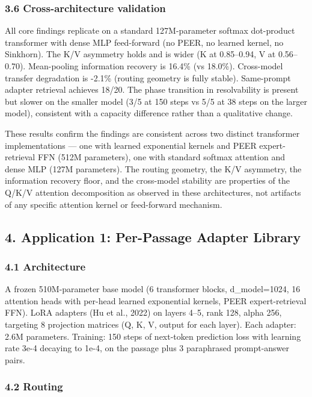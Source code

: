 \subsubsection{3.6 Cross-architecture validation}\label{cross-architecture-validation}

All core findings replicate on a standard 127M-parameter softmax dot-product transformer with dense MLP feed-forward (no PEER, no learned kernel, no Sinkhorn). The K/V asymmetry holds and is wider (K at 0.85--0.94, V at 0.56--0.70). Mean-pooling information recovery is 16.4\% (vs 18.0\%). Cross-model transfer degradation is -2.1\% (routing geometry is fully stable). Same-prompt adapter retrieval achieves 18/20. The phase transition in resolvability is present but slower on the smaller model (3/5 at 150 steps vs 5/5 at 38 steps on the larger model), consistent with a capacity difference rather than a qualitative change.

These results confirm the findings are consistent across two distinct transformer implementations --- one with learned exponential kernels and PEER expert-retrieval FFN (512M parameters), one with standard softmax attention and dense MLP (127M parameters). The routing geometry, the K/V asymmetry, the information recovery floor, and the cross-model stability are properties of the Q/K/V attention decomposition as observed in these architectures, not artifacts of any specific attention kernel or feed-forward mechanism.

\subsection{4. Application 1: Per-Passage Adapter Library}\label{application-1-per-passage-adapter-library}

\subsubsection{4.1 Architecture}\label{architecture}

A frozen 510M-parameter base model (6 transformer blocks, d\_model=1024, 16 attention heads with per-head learned exponential kernels, PEER expert-retrieval FFN). LoRA adapters (Hu et al., 2022) on layers 4--5, rank 128, alpha 256, targeting 8 projection matrices (Q, K, V, output for each layer). Each adapter: 2.6M parameters. Training: 150 steps of next-token prediction loss with learning rate 3e-4 decaying to 1e-4, on the passage plus 3 paraphrased prompt-answer pairs.

\subsubsection{4.2 Routing}\label{routing}

